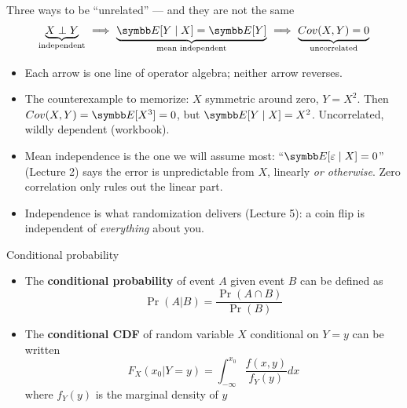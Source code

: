 \documentclass[aspectratio=169,11pt]{beamer}
\begin{document}
\begin{frame}{Three ways to be ``unrelated'' --- and they are not the same}
\begin{align*}
	\underbrace{X \perp Y}_{\text{independent}}
	\ \Longrightarrow\
	\underbrace{\E[Y \mid X] = \E[Y]}_{\text{mean independent}}
	\ \Longrightarrow\
	\underbrace{Cov(X, Y) = 0}_{\text{uncorrelated}}
\end{align*}
\begin{itemize}
	\item Each arrow is one line of operator algebra; \alert{neither arrow reverses.}
	\medskip
	\item The counterexample to memorize: $X$ symmetric around zero, $Y = X^2$. Then $Cov(X, Y) = \E[X^3] = 0$,
	but $\E[Y \mid X] = X^2$. Uncorrelated, wildly dependent (workbook).
	\medskip
	\item Mean independence is the one we will assume most: ``$\E[\varepsilon \mid X] = 0$'' (Lecture 2)
	says the error is unpredictable from $X$, linearly \emph{or otherwise}. Zero correlation only
	rules out the linear part.
	\medskip
	\item Independence is what randomization delivers (Lecture 5): a coin flip is independent of
	\emph{everything} about you.
\end{itemize}
\end{frame}


\begin{frame}{Conditional probability}
\begin{itemize}
	\item The {\bf conditional probability} of event $A$ given event $B$ can be defined as\[
			\Pr\left(A|B\right) = \frac{\Pr\left(A \cap B\right)}{\Pr(B)}
	\]
	

	
	\item The {\bf conditional CDF} of random variable $X$ conditional on $Y=y$ can be written\[
			F_{X} \left(x_0 |Y=y\right) = \int_{-\infty}^{x_0} \frac{f\left(x,y\right)}{f_{Y}\left(y\right)}dx
	\]
	where $f_{Y}\left(y\right)$ is the marginal density of $y$
	

\end{itemize}
\end{frame}
\end{document}

